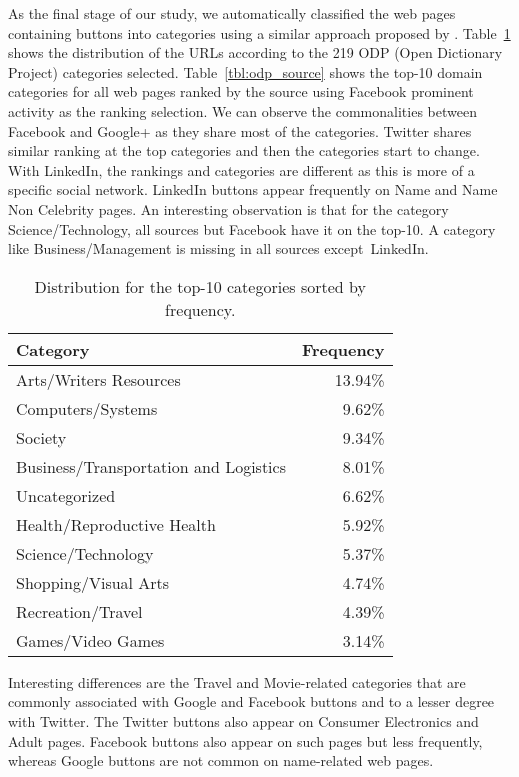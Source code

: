 \documentclass{sig-alternate}
\begin{document}
As the final stage of our study, we  automatically classified the web pages containing buttons into categories  using a similar approach proposed by \cite{Bennett09}.
Table~\ref{tbl:odp_dist} shows the distribution of the URLs according to the 219 ODP (Open Dictionary Project) categories selected.
Table~\ref{tbl:odp_source} shows the top-10 domain categories for all web pages ranked by the source using Facebook prominent activity as the
ranking selection. We can observe  the commonalities between Facebook and Google+ as they share most of the categories. Twitter shares similar 
ranking at the top categories and then the categories start to change.  With LinkedIn, the rankings and categories are different as this is more of a
specific social network. LinkedIn buttons appear frequently on Name and Name Non Celebrity pages. An interesting observation is that for the category 
Science/Technology, all sources but Facebook have it on the top-10. A category like Business/Management is missing in all sources except~LinkedIn.

\begin{table}
\centering
\begin{tabular}{|l|r|} \hline
Category & Frequency \\ \hline
Arts/Writers Resources	& 13.94\% \\ \hline
Computers/Systems&	9.62\% \\ \hline
Society	&9.34\% \\ \hline
Business/Transportation and Logistics&	8.01\% \\ \hline
Uncategorized	&6.62\% \\ \hline
Health/Reproductive Health&	5.92\% \\ \hline
Science/Technology	&5.37\% \\ \hline
Shopping/Visual Arts&	4.74\% \\ \hline
Recreation/Travel	&4.39\% \\ \hline
Games/Video Games&	3.14\% \\ \hline

\end{tabular}
\caption{Distribution for the top-10 categories sorted by frequency.}
\label{tbl:odp_dist}

\end{table}



Interesting differences are the Travel and Movie-related categories that are commonly associated with Google and Facebook buttons and to a lesser degree with Twitter. The Twitter buttons also appear on Consumer Electronics and Adult pages.  Facebook buttons also appear on such pages but less frequently, whereas Google buttons are not common on name-related web pages.
\end{document}
